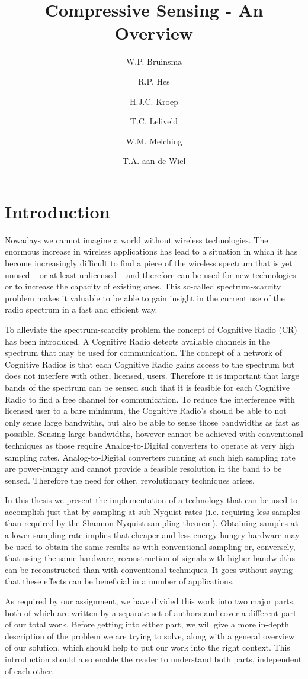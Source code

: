 \documentclass[a4paper, openany, oneside]{memoir}
\title{Compressive Sensing - An Overview}
\author{W.P. Bruinsma \and R.P. Hes \and H.J.C. Kroep \and T.C. Leliveld \and W.M. Melching \and T.A. aan de Wiel}
\begin{document}
\chapter{Introduction}
Nowadays we cannot imagine a world without wireless technologies. The enormous increase in wireless applications has lead to a situation in which it has become increasingly difficult to find a piece of the wireless spectrum that is yet unused -- or at least unlicensed -- and therefore can be used for new technologies or to increase the capacity of existing ones. This so-called spectrum-scarcity problem makes it valuable to be able to gain insight in the current use of the radio spectrum in a fast and efficient way.

To alleviate the spectrum-scarcity problem the concept of Cognitive Radio (CR) has been introduced. A Cognitive Radio detects
available channels in the spectrum that may be used for communication. The concept of a network of Cognitive Radios is that each Cognitive Radio gains access to the spectrum but does not interfere with other, licensed, users. Therefore it is important that large bands of the spectrum can be sensed such that it is feasible for each Cognitive Radio to find a free channel for communication. To reduce the interference with licensed user to a bare minimum, the Cognitive Radio's should be able to not only sense large bandwiths, but also be able to sense those bandwidths as fast as possible. Sensing large bandwidths, however cannot be achieved with conventional techniques as those require Analog-to-Digital converters to operate at very high sampling rates. Analog-to-Digital converters running at such high sampling rate are power-hungry and cannot provide a feasible resolution in the band to be sensed. Therefore the need for other, revolutionary techniques arises.

In this thesis we present the implementation of a technology that can be used to accomplish just that by sampling at sub-Nyquist rates (i.e. requiring less samples than required by the Shannon-Nyquist sampling theorem).  Obtaining samples at a lower sampling rate implies that cheaper and less energy-hungry hardware may be used to obtain the same results as with conventional sampling or, conversely, that using the same hardware, reconstruction of signals with higher bandwidths can be reconstructed than with conventional techniques. It goes without saying that these effects can be beneficial in a number of applications.

As required by our assignment, we have divided this work into two major parts, both of which are written by a separate set of authors and cover a different part of our total work. Before getting into either part, we will give a more in-depth description of the problem we are trying to solve, along with a general overview of our solution, which should help to put our work into the right context. This introduction should also enable the reader to understand both parts, independent of each other.
\end{document}
